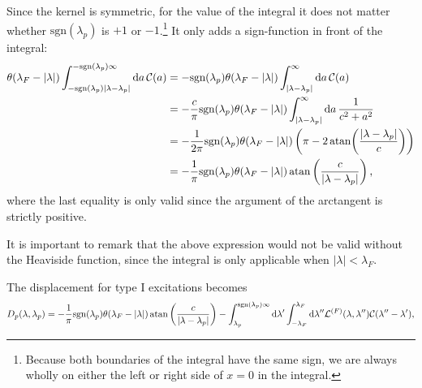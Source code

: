 \documentclass[11pt, a4paper,draft]{report} %
\newcommand{\inversetruncc}{\mathcal{L}}
\newcommand{\kernel}{\mathcal{C}}
\begin{document}
Since the kernel is symmetric, for the value of the integral it does not matter whether \(\mathrm{sgn}(\lambda_p)\) is \(+1\) or \(-1\).\footnote{Because both boundaries of the integral have the same sign, we are always wholly on either the left or right side of \(x=0\) in the integral.} 
It only adds a sign-function in front of the integral:
\begin{align}
	\theta(\lambda_F - \lvert \lambda \rvert) \int_{-\textrm{sgn}(\lambda_p)\lvert\lambda-\lambda_p\rvert}^{ - \textrm{sgn}(\lambda_p)\infty} \mathrm{d}a\,\kernel(a) &= - \textrm{sgn}(\lambda_p) \theta(\lambda_F - \lvert \lambda \rvert) \int_{\lvert\lambda-\lambda_p\rvert}^{\infty} \mathrm{d}a\,\kernel(a)\\
	&= - \frac{c}{\pi} \textrm{sgn}(\lambda_p) \theta(\lambda_F - \lvert \lambda \rvert)  \int_{\lvert\lambda-\lambda_p\rvert}^{\infty} \mathrm{d}a\,\frac{1}{c^2 + a^2}\\
	&= - \frac{1}{2\pi} \textrm{sgn}(\lambda_p) \theta(\lambda_F - \lvert \lambda \rvert)  \left( \pi - 2\atan(\frac{\lvert \lambda - \lambda_p\rvert}{c})\right)\\
	&= - \frac{1}{\pi} \textrm{sgn}(\lambda_p) \theta(\lambda_F - \lvert \lambda \rvert)  \atan\left(\frac{c}{\lvert\lambda-\lambda_p\rvert}\right),
\end{align}
where the last equality is only valid since the argument of the arctangent is strictly positive.

It is important to remark that the above expression would not be valid without the Heaviside function, since the integral is only applicable when \(\lvert\lambda\rvert< \lambda_F\).

The displacement for type I excitations becomes 
\begin{equation}
	D_p(\lambda, \lambda_p) = - \frac{1}{\pi} \textrm{sgn}(\lambda_p) \theta(\lambda_F - \lvert \lambda \rvert)  \atan\left(\frac{c}{\lvert\lambda-\lambda_p\rvert}\right) - \int_{\lambda_p}^{\textrm{sgn}(\lambda_p)\infty} \mathrm{d}\lambda' \int_{-\lambda_F}^{\lambda_F} \textrm{d} \lambda'' \inversetruncc^{(F)}(\lambda,\lambda'') \kernel(\lambda''-\lambda'),
\end{equation}
\end{document}
